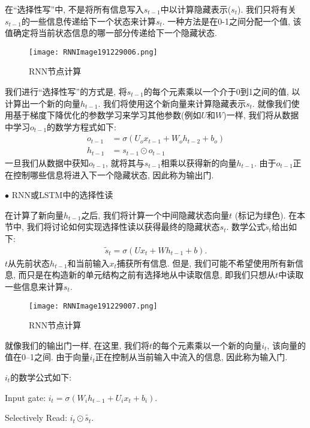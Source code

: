 \begin{example}
在“选择性写”中, 不是将所有信息写入$s_{t-1}$中以计算隐藏表示($s_t$). 我们只将有关$s_{t-1}$的一些信息传递给下一个状态来计算$s_t$.
一种方法是在0-1之间分配一个值, 该值确定将当前状态信息的哪一部分传递给下一个隐藏状态.
\begin{figure}[H]
    \centering
    \texttt{[image: RNNImage191229006.png]}
    \caption{RNN节点计算}
    \label{RNNImage191229006}
    \vspace{-0.4cm}
\end{figure}
我们进行“选择性写”的方式是, 将$s_{t-1}$的每个元素乘以一个介于0到1之间的值, 以计算出一个新的向量$h_{t-1}$. 我们将使用这个新向量来计算隐藏表示$s_t$.
就像我们使用基于梯度下降优化的参数学习来学习其他参数(例如$U$和$W$)一样, 我们将从数据中学习$o_{t-1}$的数学方程式如下:
\begin{align}
    o_{t-1}&=\sigma\left(U_{o} x_{t-1}+W_{o} h_{t-2}+b_{o}\right)\\
    h_{t-1}&=s_{t-1} \odot o_{t-1}
\end{align}
一旦我们从数据中获知$o_{t-1}$, 就将其与$s_{t-1}$相乘以获得新的向量$h_{t-1}$. 由于$o_{t-1}$正在控制哪些信息将进入下一个隐藏状态, 因此称为输出门.

$\bullet$ RNN或LSTM中的选择性读

在计算了新向量$h_{t-1}$之后, 我们将计算一个中间隐藏状态向量$t$ (标记为绿色). 在本节中, 我们将讨论如何实现选择性读以获得最终的隐藏状态$s_t$.
数学公式$\tilde{s}_{t}$给出如下:
\begin{align}
    \tilde{s}_{t}=\sigma\left(U x_{t}+W h_{t-1}+b\right).
\end{align}
$t$从先前状态$h_{t-1}$和当前输入$x_t$捕获所有信息.
但是, 我们可能不希望使用所有新信息, 而只是在构造新的单元结构之前有选择地从中读取信息,
即我们只想从$t$中读取一些信息来计算$s_t$.
\begin{figure}[H]
\centering
\texttt{[image: RNNImage191229007.png]}
\caption{RNN节点计算}
\label{RNNImage191229007}
\vspace{-0.4cm}
\end{figure}
就像我们的输出门一样, 在这里, 我们将$t$的每个元素乘以一个新的向量$i_t$, 该向量的值在0–1之间. 由于向量$i_t$正在控制从当前输入中流入的信息, 因此称为输入门.

$i_t$的数学公式如下:

\quad Input gate: $i_{t}=\sigma\left(W_{i} h_{t-1}+U_{i} x_{t}+b_{i}\right)$.

\quad Selectively Read: $i_{t} \odot \tilde{s_{t}}$.


\end{example}
